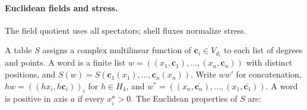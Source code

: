 \paragraph{Euclidean fields and stress.} The field quotient uses all spectators; shell fluxes normalize stress.

\begin{definition}\label{def:euclidean-table}
A table $S$ assigns a complex multilinear function of $\mathbf c_i\in V_{d_i}$ to each list of degrees and points. A word is a finite list $w=((x_1,\mathbf c_1),\ldots,(x_n,\mathbf c_n))$ with distinct positions, and $S(w)=S(\mathbf c_1(x_1),\ldots,\mathbf c_n(x_n))$. Write $ww'$ for concatenation, $hw=((hx_i,h\mathbf c_i))_i$ for $h\in H_4$, and $w^*=((x_n,\overline{\mathbf c_n}),\ldots,(x_1,\overline{\mathbf c_1}))$. A word is positive in axis $a$ if every $x_i^a>0$. The Euclidean properties of $S$ are:


\end{definition}
